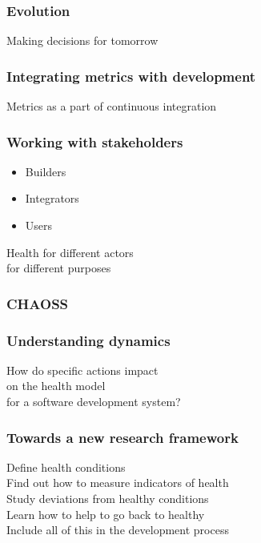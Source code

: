 \documentclass[17pt,aspectratio=169,hyperref=pdfusetitle]{beamer}
\begin{document}
\begin{frame}[fragile]
  \frametitle{Evolution}

  Making decisions for tomorrow
  
\end{frame}

\begin{frame}[fragile]
  \frametitle{Integrating metrics with development}

  Metrics as a part of continuous integration
  
\end{frame}

\begin{frame}[fragile]
  \frametitle{Working with stakeholders}

  \begin{itemize}
  \item Builders
  \item Integrators
  \item Users
  \end{itemize}

  Health for different actors \\
  for different purposes \\
  
\end{frame}

\begin{frame}[fragile]
  \frametitle{CHAOSS}

  
\end{frame}

\begin{frame}[fragile]
  \frametitle{Understanding dynamics}

  How do specific actions impact \\
  on the health model \\
  for a software development system?
\end{frame}

\begin{frame}[fragile]
  \frametitle{Towards a new research framework}

  Define health conditions \\
  Find out how to measure indicators of health \\
  Study deviations from healthy conditions \\
  Learn how to help to go back to healthy \\

  Include all of this in the development process
\end{frame}
\end{document}
